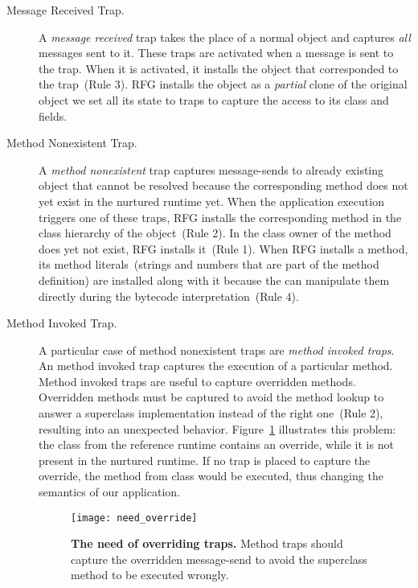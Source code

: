\begin{description}
\item[Message Received Trap.] A \emph{message received} trap takes the place of a normal object and captures \emph{all} messages sent to it. These traps are activated when a message is sent to the trap. When it is activated, it installs the object that corresponded to the trap~(Rule 3). RFG installs the object as a \emph{partial} clone of the original object \ie we set all its state to traps to capture the access to its class and fields.%

\item[Method Nonexistent Trap.] A \emph{method nonexistent} trap captures message-sends to already existing object that cannot be resolved because the corresponding method does not yet exist in the nurtured runtime yet. When the application execution triggers one of these traps, RFG installs the corresponding method in the class hierarchy of the object~(Rule 2). In the class owner of the method does yet not exist, RFG installs it~(Rule 1). When RFG installs a method, its method literals~(\eg strings and numbers that are part of the method definition) are installed along with it because the \VM can manipulate them directly during the bytecode interpretation~(Rule 4).

\item[Method Invoked Trap.] A particular case of method nonexistent traps are \emph{method invoked traps}. An method invoked trap captures the execution of a particular method. Method invoked traps are useful to capture overridden methods. Overridden methods must be captured to avoid the method lookup to answer a superclass implementation instead of the right one~(Rule 2), resulting into an unexpected behavior. Figure~\ref{fig:need_override} illustrates this problem: the class  from the reference runtime contains an override, while it is not present in the nurtured runtime. If no trap is placed to capture the override, the method  from class  would be executed, thus changing the semantics of our application.

\begin{figure}[ht]
\begin{center}
\texttt{[image: need\_override]}
\caption{\small\textbf{The need of overriding traps.} Method traps should capture the overridden  message-send to avoid the superclass method to be executed wrongly.\label{fig:need_override}}
\end{center}
\end{figure}

\end{description}

